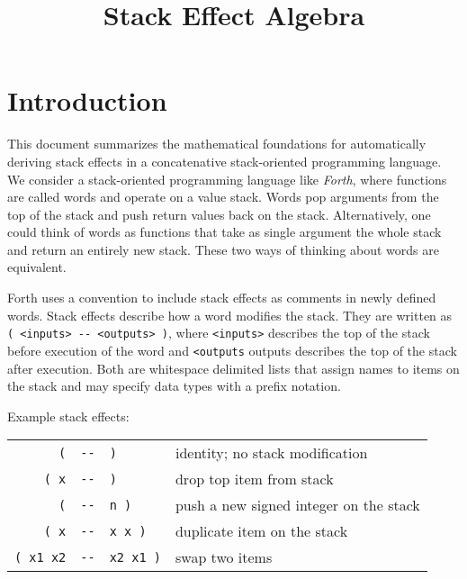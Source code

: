 \documentclass[a4paper]{hitec}
\title{Stack Effect Algebra}
\date{}
\begin{document}
\maketitle

\section{Introduction}

This document summarizes the mathematical foundations for automatically deriving
stack effects in a concatenative stack-oriented programming language. We 
consider a stack-oriented programming language like \textit{Forth}, where 
functions are called words and operate on a value stack. Words pop arguments 
from the top of the stack and push return values back on the stack. 
Alternatively, one could think of words as functions that take as single 
argument the whole stack and return an entirely new stack. These two ways of 
thinking about words are equivalent.

Forth uses a convention to include stack effects as comments in newly
defined words. Stack effects describe how a word modifies the stack. They are
written as \verb|( <inputs> -- <outputs> )|, where \verb|<inputs>| describes
the top of the stack before execution of the word and \verb|<outputs| outputs
describes the top of the stack after execution. Both are whitespace delimited
lists that assign names to items on the stack and may specify data types with a
prefix notation.

\vspace{0.5cm}
Example stack effects:

\begin{tabular}{rcll}
	\verb|(|&\verb|--|&\verb|)| & identity; no stack modification \\
	\verb|( x|&\verb|--|&\verb|)| & drop top item from stack \\
	\verb|(|&\verb|--|&\verb|n )| & push a new signed integer on the stack \\
	\verb|( x|&\verb|--|&\verb|x x )| & duplicate item on the stack \\
	\verb|( x1 x2|&\verb|--|&\verb|x2 x1 )| & swap two items
\end{tabular}
\vspace{0.5cm}
\end{document}
